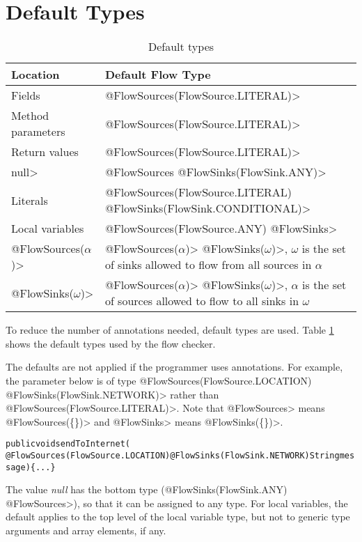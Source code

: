 \section{Default Types\label{flow-defaults}}

\begin{table}[h]
    \begin{tabular}{ll}
    \toprule
\bf{Location}&\bf{Default Flow Type}\\
\midrule 
    Fields &  \<@FlowSources(FlowSource.LITERAL)> \\ 
    Method parameters &  \<@FlowSources(FlowSource.LITERAL)> \\ 
    Return values &  \<@FlowSources(FlowSource.LITERAL)> \\ 
    \<null> &  \<@FlowSources @FlowSinks(FlowSink.ANY)>\\ 
    Literals & \<@FlowSources(FlowSource.LITERAL) @FlowSinks(FlowSink.CONDITIONAL)>\\ 
   Local variables  &   \<@FlowSources(FlowSource.ANY) @FlowSinks> \\ 
   \<@FlowSources($\alpha$)>&\<@FlowSources($\alpha$)>
   \<@FlowSinks($\omega$)>,  $\omega$ is the set of  sinks allowed to flow from all sources in $\alpha$ \\ 
      \<@FlowSinks($\omega$)>&\<@FlowSources($\alpha$)>
      \<@FlowSinks($\omega$)>, $\alpha$ is the set of  sources allowed to flow to all sinks in $\omega$ \\ 
      
      \bottomrule
    \end{tabular}
    \caption{Default types}\label{table:defaults}
\end{table}


To reduce the number of annotations needed, default types are
used. Table \ref{table:defaults} shows the default types used by the
flow checker.


The defaults are not applied if the programmer uses annotations.  For
example, the parameter below is of type
\<@FlowSources(FlowSource.LOCATION) @FlowSinks(FlowSink.NETWORK)>
rather than  \<@FlowSources({FlowSource.LITERAL})>. Note that \<@FlowSources>
means \<@FlowSources(\{\})> and \<@FlowSinks>  means \<@FlowSinks(\{\})>.
\begin{alltt}
public void sendToInternet(
    @FlowSources(FlowSource.LOCATION) @FlowSinks(FlowSink.NETWORK) String message)\{...\}
\end{alltt} 

The value \emph{null} has the bottom type (\<@FlowSinks(FlowSink.ANY)
@FlowSources>),
so that it can be assigned to any type. For local variables, the
default applies to the top level of the local variable type, but not
to generic type arguments and array elements, if any.

